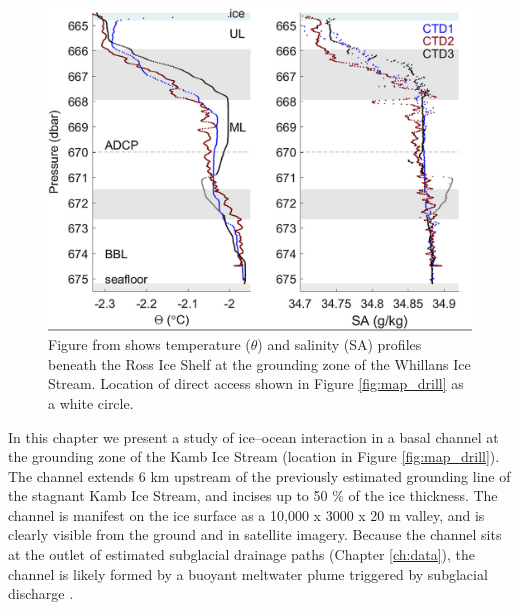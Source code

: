 \begin{figure}[!ht]
\centering
    \includegraphics[width=1\textwidth]{chapters/4/oceanobs1.png}
    \caption[]{Figure from \cite{begeman2018ocean} shows temperature ($\theta$) and salinity (SA) profiles beneath the Ross Ice Shelf at the grounding zone of the Whillans Ice Stream. Location of direct access shown in Figure \ref{fig:map_drill} as a white circle.}
    \label{fig:oceanobs1}
\end{figure}

In this chapter we present a study of ice--ocean interaction in a basal channel at the grounding zone of the Kamb Ice Stream (location in Figure \ref{fig:map_drill}). 
The channel extends 6 km upstream of the previously estimated grounding line of the stagnant Kamb Ice Stream, and incises up to 50 \% of the ice thickness. The channel is manifest on the ice surface as a  10,000 x 3000 x 20 m valley, and is clearly visible from the ground and in satellite imagery. Because the channel sits at the outlet of estimated subglacial drainage paths (Chapter \ref{ch:data}), the channel is likely formed by a buoyant meltwater plume triggered by subglacial discharge \citep{kim2016active, alley2016impacts}.

